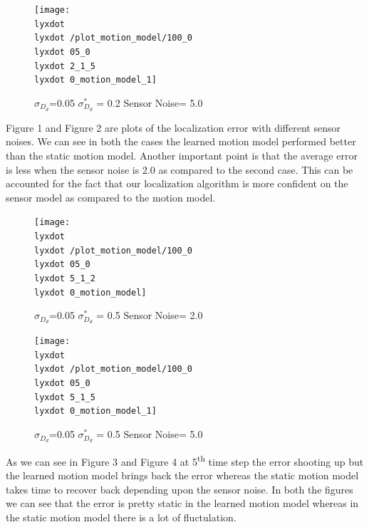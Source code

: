 \documentclass[12pt]{dalcsthesis}
\begin{document}
\begin{figure}
\caption{$\sigma_{D_{d}}$=0.05 $\sigma_{D_{d}}^{*}$ = 0.2 Sensor Noise= 5.0}


\texttt{[image: \\lyxdot \\lyxdot /plot\_motion\_model/100\_0\\lyxdot 05\_0\\lyxdot 2\_1\_5\\lyxdot 0\_motion\_model\_1]}

\end{figure}


Figure 1 and Figure 2 are plots of the localization error with different
sensor noises. We can see in both the cases the learned motion model
performed better than the static motion model. Another important point
is that the average error is less when the sensor noise is 2.0 as
compared to the second case. This can be accounted for the fact that
our localization algorithm is more confident on the sensor model as
compared to the motion model. 

\begin{figure}
\caption{$\sigma_{D_{d}}$=0.05 $\sigma_{D_{d}}^{*}$ = 0.5 Sensor Noise= 2.0}


\texttt{[image: \\lyxdot \\lyxdot /plot\_motion\_model/100\_0\\lyxdot 05\_0\\lyxdot 5\_1\_2\\lyxdot 0\_motion\_model]}

\end{figure}


\begin{figure}
\caption{$\sigma_{D_{d}}$=0.05 $\sigma_{D_{d}}^{*}$ = 0.5 Sensor Noise= 5.0}


\texttt{[image: \\lyxdot \\lyxdot /plot\_motion\_model/100\_0\\lyxdot 05\_0\\lyxdot 5\_1\_5\\lyxdot 0\_motion\_model\_1]}

\end{figure}


As we can see in Figure 3 and Figure 4 at 5\textsuperscript{th} time
step the error shooting up but the learned motion model brings back
the error whereas the static motion model takes time to recover back
depending upon the sensor noise. In both the figures we can see that
the error is pretty static in the learned motion model whereas in
the static motion model there is a lot of fluctulation. 
\end{document}
